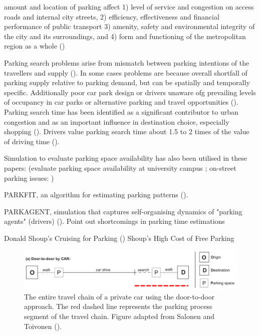 amount and location of parking affect 1) level of service and congestion on access roads and internal city streets, 2) efficiency, effectiveness and financial performance of public transport 3) amenity, safety and environmental integrity of the city and its surroundings, and 4) form and functioning of the metropolitan region as a whole (\cite{Young1991})

Parking search problems arise from mismatch between parking intentions of the travellers and supply (\cite{Axhausen1993}).
In some cases problems are because overall shortfall of parking supply relative to parking demand, but can be spatially and temporally specific. Additionally poor car park design or drivers unaware ofg prevailing levels of occupancy in car parks or alternative parking and travel opportunities (\cite{Axhausen1993}).
Parking search time has been identified as a significant contributor to urban congestion and as an important influence in destination choice, especially shopping (\cite{Axhausen1993}).
Drivers value parking search time about 1.5 to 2 times of the value of driving time (\cite{Axhausen1991}).

Simulation to evaluate parking space availability has also been utilised in these papers: (evaluate parking space availability at university campus \cite{Harris1997}; on-street parking issues: \cite{Saltzman1997})

PARKFIT, an algorithm for estimating parking patterns (\cite{Levy2015}).

PARKAGENT, simulation that captures self-organising dynamics of "parking agents" (drivers) (\cite{Benenson2008}). Point out shortcomings in parking time estimations

Donald Shoup's Cruising for Parking (\cite{Shoup2006})
Shoup's High Cost of Free Parking


\begin{figure}[H]%
    \includegraphics[width=\textwidth]{images/door2door.png}
    \caption[Door-to-door approach]{The entire travel chain of a private car using the door-to-door approach. The red dashed line represents the parking process segment of the travel chain. Figure adapted from Salonen and Toivonen (\citeyear{Salonen2013}).}%
    \label{fig:door-to-door}%
\end{figure}

